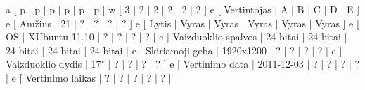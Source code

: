 \xtableu
{
  a [ p | p | p | p | p | p ]
  w [ 3 | 2 | 2 | 2 | 2 | 2 ]
  e [ Vertintojas         | A | B | C | D | E ]
  e [ Amžius              | 21 | ? | ? | ? | ? ]
  e [ Lytis               | Vyras | Vyras | Vyras | Vyras | Vyras ]
  e [ OS                  | XUbuntu 11.10 | ? | ? | ? | ? ]
  e [ Vaizduoklio spalvos | 24 bitai | 24 bitai | 24 bitai | 24 bitai | 24 bitai ]
  e [ Skiriamoji geba     | 1920x1200 | ? | ? | ? | ? ]
  e [ Vaizduoklio dydis   | 17" | ? | ? | ? | ? ]
  e [ Vertinimo data      | 2011-12-03 | ? | ? | ? | ? ]
  e [ Vertinimo laikas    | ? | ? | ? | ? | ? ]
}